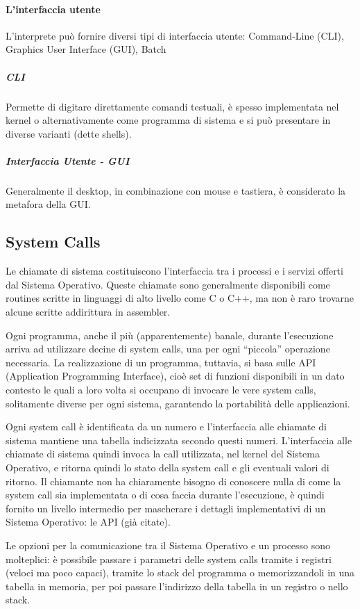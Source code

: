 \documentclass[a4paper]{article}
\begin{document}
\paragraph{L'interfaccia utente}
L'interprete può fornire diversi tipi di interfaccia utente: Command-Line (CLI), Graphics User Interface (GUI), Batch
\subparagraph{CLI} Permette di digitare direttamente comandi testuali, è spesso implementata nel kernel o alternativamente come programma di sistema e si può presentare in diverse varianti (dette shells).
\subparagraph{Interfaccia Utente - GUI} Generalmente il desktop, in combinazione con mouse e tastiera, è considerato la metafora della GUI.

\subsection{System Calls}
Le chiamate di sistema costituiscono l'interfaccia tra i processi e i servizi offerti dal Sistema Operativo. Queste chiamate sono generalmente disponibili come routines scritte in linguaggi di alto livello come C o C++, ma non è raro trovarne alcune scritte addirittura in assembler.

Ogni programma, anche il più (apparentemente) banale, durante l'esecuzione arriva ad utilizzare decine di system calls, una per ogni ``piccola'' operazione necessaria.\newline
La realizzazione di un programma, tuttavia, si basa sulle API (Application Programming Interface), cioè set di funzioni disponibili in un dato contesto le quali a loro volta si occupano di invocare le vere system calls, solitamente diverse per ogni sistema, garantendo la portabilità delle applicazioni.

Ogni system call è identificata da un numero e l'interfaccia alle chiamate di sistema mantiene una tabella indicizzata secondo questi numeri. L'interfaccia alle chiamate di sistema quindi invoca la call utilizzata, nel kernel del Sistema Operativo, e ritorna quindi lo stato della system call e gli eventuali valori di ritorno. Il chiamante non ha chiaramente bisogno di conoscere nulla di come la system call sia implementata o di cosa faccia durante l'esecuzione, è quindi fornito un livello intermedio per mascherare i dettagli implementativi di un Sistema Operativo: le API (già citate).

Le opzioni per la comunicazione tra il Sistema Operativo e un processo sono molteplici: è possibile passare i parametri delle system calls tramite i registri (veloci ma poco capaci), tramite lo stack del programma o memorizzandoli in una tabella in memoria, per poi passare l'indirizzo della tabella in un registro o nello stack.
\end{document}
